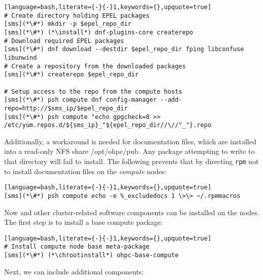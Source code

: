 \begin{lstlisting}[language=bash,literate={-}{-}1,keywords={},upquote=true]
# Create directory holding EPEL packages
[sms](*\#*) mkdir -p $epel_repo_dir
[sms](*\#*) (*\install*) dnf-plugins-core createrepo
# Download required EPEL packages
[sms](*\#*) dnf download --destdir $epel_repo_dir fping libconfuse libunwind
# Create a repository from the downloaded packages
[sms](*\#*) createrepo $epel_repo_dir

# Setup access to the repo from the compute hosts
[sms](*\#*) psh compute dnf config-manager --add-repo=http://$sms_ip/$epel_repo_dir
[sms](*\#*) psh compute "echo gpgcheck=0 >> /etc/yum.repos.d/${sms_ip}_"${epel_repo_dir//\//"_"}.repo
\end{lstlisting}


\noindent Additionally, a workaround is needed for \OHPC{} documentation files,
which are installed into a read-only NFS share /opt/ohpc/pub. Any package
attempting to write to that directory will fail to install. The following
prevents that by directing \texttt{rpm} not to install documentation files on
the {\em compute} nodes: 

\begin{lstlisting}[language=bash,literate={-}{-}1,keywords={},upquote=true]
[sms](*\#*) psh compute echo -e %_excludedocs 1 \>\> ~/.rpmmacros
\end{lstlisting}

\noindent Now \OHPC{} and other cluster-related software components can be
installed on the nodes. The first step is to install a base compute package:
\begin{lstlisting}[language=bash,literate={-}{-}1,keywords={},upquote=true]
# Install compute node base meta-package
[sms](*\#*) (*\chrootinstall*) ohpc-base-compute
\end{lstlisting}

\noindent Next, we can include additional components:
